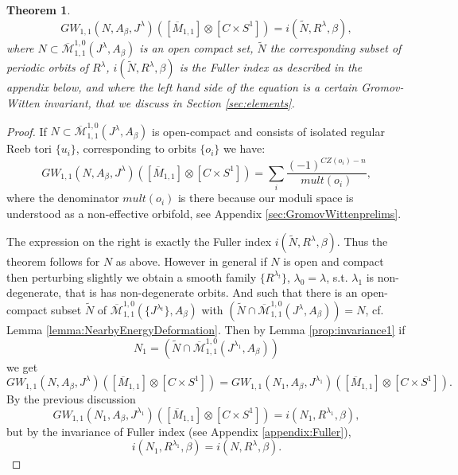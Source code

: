 \documentclass{amsart}
\numberwithin{equation}{section}
\newtheorem{theorem}[equation]{Theorem}
\theoremstyle{definition}
\theoremstyle{remark}
\begin{document}
\begin{theorem} \label{thm:GWFullerMain} 
\begin{equation*}
   GW _{1,1} (N,A _{\beta},J ^{\lambda} ) ([\overline {M} _{1,1}] \otimes [C \times S ^{1} ]) = i (\widetilde{N}, R ^{\lambda}, \beta),
\end{equation*}
where $N \subset \overline{\mathcal{M}} ^{1,0} 
_{1,1} (
{J} ^{\lambda},
   A _{\beta}  )$ is an open compact set, $\widetilde{N} $ the corresponding subset of periodic orbits of $R ^{\lambda} $, $i (\widetilde{N}, R ^{\lambda}, \beta)$ is the Fuller index as described in the appendix below, and where the left hand side of the equation is a certain Gromov-Witten invariant, that we discuss in Section \ref{sec:elements}.
\end{theorem}
\begin{proof}
 If ${N} \subset \overline{\mathcal{M}} ^{1,0}   _{1,1} (J ^{\lambda}, A _{\beta} ) $ is open-compact and consists of isolated regular Reeb tori $\{u _{i} \}$, corresponding to orbits $\{o _{i} \}$ we have:
\begin{equation*}
   GW _{1,1} (N,  A _{\beta}, J ^{\lambda} ) ([\overline{M} _{1,1}   ] \otimes [C \times S ^{1} ]) = \sum _{i} \frac{(-1) ^{CZ (o _{i} ) - n} }{mult (o _{i} )},
\end{equation*}
where the denominator $mult (o _{i} )$ is there because our moduli space is understood as a non-effective orbifold, see Appendix \ref{sec:GromovWittenprelims}.

The expression on the right is exactly the Fuller index $i (\widetilde{N}, R ^{\lambda},  \beta)$.
Thus the theorem follows for $N$ as above. However in general if $N$ is open and compact then perturbing slightly we obtain a smooth family $\{R ^{\lambda _{t} } \}$, $\lambda _{0} =\lambda $, s.t.
 $\lambda _{1} $ is non-degenerate, that is has non-degenerate orbits. 
And such that there is an open-compact subset $\widetilde{N} $ of $\overline{\mathcal{M}}  _{1,1} ^{1,0}  (\{J ^{\lambda _{t} } \}, A _{\beta} )$ with $(\widetilde{N} \cap \overline{\mathcal{M}}  _{1,1} ^{1,0}  (J ^{\lambda}, A _{\beta} )) = N $, cf. Lemma \ref{lemma:NearbyEnergyDeformation}.
 Then by Lemma \ref{prop:invariance1} if $$N_1=(\widetilde{N} \cap \overline{\mathcal{M}} ^{1,0}   _{1,1} (J ^{\lambda _{1} }, A _{\beta} ))
$$ we get $$GW _{1,1} (N,  A _{\beta}, J ^{\lambda} ) ([\overline{M}  _{1,1} ] \otimes [C \times S ^{1} ]) = GW _{1,1} (N _{1} ,  A _{\beta}, J ^{\lambda _{1} } ) ([\overline{M} _{1,1}  ] \otimes [C \times S ^{1} ]).
$$
By the previous discussion 
\begin{equation*}
   GW _{1,1} (N _{1} ,  A _{\beta}, J ^{\lambda _{1} } ) ([\overline{M} _{1,1}   ] \otimes [C \times S ^{1} ]) = i (N_1, R ^{\lambda_1},  \beta), 
\end{equation*}
but by the invariance of Fuller index (see Appendix \ref{appendix:Fuller}), $$i (N_1, R ^{\lambda_1},  \beta) = i (N, R ^{\lambda},  \beta).
$$ 
\end{proof}
\end{document}
